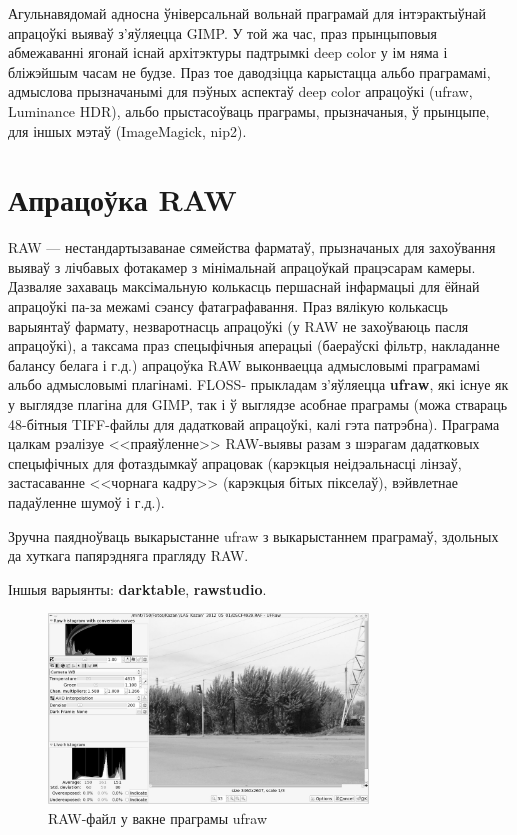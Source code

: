\documentclass[10pt, a5paper]{article}
\begin{document}
Агульнавядомай адносна ўніверсальнай вольнай праграмай для інтэрактыўнай апрацоўкі выяваў з'яўляецца GIMP. У той жа час, праз прынцыповыя абмежаванні ягонай існай архітэктуры падтрымкі deep color у ім няма і бліжэйшым часам не будзе. Праз тое даводзіцца карыстацца альбо праграмамі, адмыслова прызначанымі для пэўных аспектаў deep color апрацоўкі (ufraw, Luminance HDR), альбо прыстасоўваць праграмы, прызначаныя, ў прынцыпе, для іншых мэтаў (ImageMagick, nip2).

\section*{Апрацоўка RAW}

RAW --- нестандартызаванае сямейства фарматаў, прызначаных для захоўвання выяваў з лічбавых фотакамер з мінімальнай апрацоўкай працэсарам камеры. Дазваляе захаваць максімальную колькасць першаснай інфармацыі для ёйнай апрацоўкі па-за межамі сэансу фатаграфавання. Праз вялікую колькасць варыянтаў фармату, незваротнасць апрацоўкі (у RAW не захоўваюць пасля апрацоўкі), а таксама праз спецыфічныя аперацыі (баераўскі фільтр, накладанне балансу белага і г.д.) апрацоўка RAW выконваецца адмысловымі праграмамі альбо адмысловымі плагінамі. FLOSS- \linebreak прыкладам з'яўляецца \textbf{ufraw}, які існуе як у выглядзе плагіна для GIMP, так і ў выглядзе асобнае праграмы (можа ствараць 48-бітныя TIFF-файлы для дадатковай апрацоўкі, калі гэта патрэбна). Праграма цалкам рэалізуе <<праяўленне>> RAW-выявы разам з шэрагам дадатковых спецыфічных для фотаздымкаў апрацовак (карэкцыя неідэальнасці лінзаў, застасаванне <<чорнага кадру>> (карэкцыя бітых пікселаў), вэйвлетнае падаўленне шумоў і г.д.).

Зручна паядноўваць выкарыстанне ufraw з выкарыстаннем праграмаў, здольных да хуткага папярэдняга прагляду RAW.

Іншыя варыянты: \textbf{darktable}, \textbf{rawstudio}.

\begin{figure}[htpb]
\centering
 \includegraphics[width=85mm]{LAS_LVEE_2012_RAW_gs.jpg}
 \caption{RAW-файл у вакне праграмы ufraw}
 \label{fig:RAW}
\end{figure}
\end{document}
